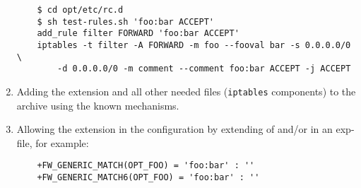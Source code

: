\begin{enumerate}
\begin{example}
\begin{verbatim}
    $ cd opt/etc/rc.d
    $ sh test-rules.sh 'foo:bar ACCEPT'
    add_rule filter FORWARD 'foo:bar ACCEPT'
    iptables -t filter -A FORWARD -m foo --fooval bar -s 0.0.0.0/0 \
        -d 0.0.0.0/0 -m comment --comment foo:bar ACCEPT -j ACCEPT
\end{verbatim}
\end{example}

\item Adding the extension and all other needed files
(\texttt{iptables} components) to the archive using
the known mechanisms.
\item Allowing the extension in the configuration by extending
of  and/or  in an exp-file,
for example:

\begin{example}
\begin{verbatim}
    +FW_GENERIC_MATCH(OPT_FOO) = 'foo:bar' : ''
    +FW_GENERIC_MATCH6(OPT_FOO) = 'foo:bar' : ''
\end{verbatim}
\end{example}
\end{enumerate}
